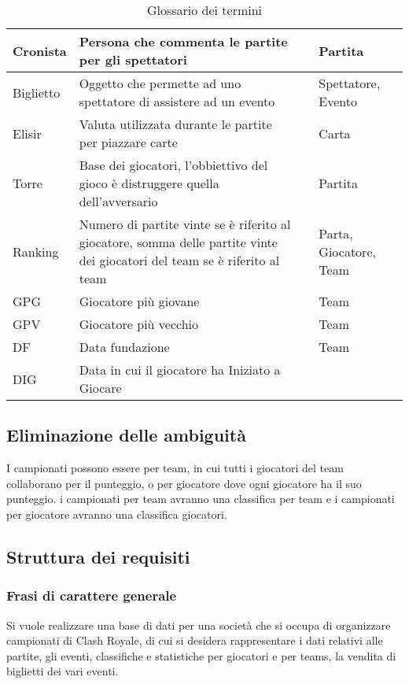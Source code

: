 \documentclass{article}
\begin{document}
\begin{table}
\begin{tabularx}{\textwidth}{|l|X|l|X|}
Cronista & Persona che commenta le partite per gli spettatori & & Partita \\ \hline
Biglietto & Oggetto che permette ad uno spettatore di assistere ad un evento & & Spettatore, Evento \\ \hline
Elisir    & Valuta utilizzata durante le partite per piazzare carte & & Carta \\ \hline
Torre     & Base dei giocatori, l'obbiettivo del gioco è distruggere quella dell'avversario & & Partita \\ \hline
Ranking   & Numero di partite vinte se è riferito al giocatore, somma delle partite vinte dei giocatori del team se è riferito al team & & Parta, Giocatore, Team \\ \hline
GPG & Giocatore più giovane & & Team \\ \hline
GPV & Giocatore più vecchio & & Team \\ \hline
DF & Data fundazione & & Team \\ \hline
DIG & Data in cui il giocatore ha Iniziato a Giocare & & \\ \hline
\end{tabularx}
\caption{Glossario dei termini}
\label{table_glossario_termini}
\end{table}


\subsection{Eliminazione delle ambiguità}

I campionati possono essere per team, in cui tutti i giocatori del team collaborano per il punteggio, o per giocatore dove ogni giocatore ha il suo punteggio. i campionati per team avranno una classifica per team e i campionati per giocatore avranno una classifica giocatori.

\subsection{Struttura dei requisiti}

\subsubsection{Frasi di carattere generale}

Si vuole realizzare una base di dati per una società che si occupa di organizzare campionati di Clash Royale, di cui si desidera rappresentare i dati relativi alle partite, gli eventi, classifiche e statistiche per giocatori e per teams, la vendita di biglietti dei vari eventi.
\end{document}
